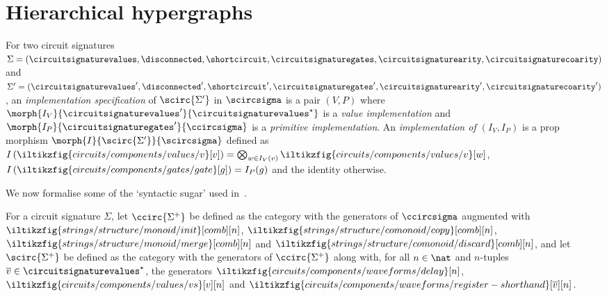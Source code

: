 \section{Hierarchical hypergraphs}

\begin{definition}[Implementation]
    For two circuit signatures \(\Sigma = (
        \circuitsignaturevalues,
        \disconnected,
        \shortcircuit,
        \circuitsignaturegates,
        \circuitsignaturearity,
        \circuitsignaturecoarity
    )\) and \(\Sigma^\prime = (
        \circuitsignaturevalues^\prime,
        \disconnected^\prime,
        \shortcircuit^\prime,
        \circuitsignaturegates^\prime,
        {\circuitsignaturearity}^\prime,
        {\circuitsignaturecoarity}^\prime
    )\), an \emph{implementation specification} of \(\scirc{\Sigma^\prime}\) in
    \(\scircsigma\)
    is a pair \((V,P)\) where \(
        \morph{I_V}{\circuitsignaturevalues^\prime}{\circuitsignaturevalues^\star}
    \) is a \emph{value implementation} and \(
        \morph{I_P}{\circuitsignaturegates^\prime}{\ccircsigma}
    \) is a \emph{primitive implementation}.
    An \emph{implementation of \((I_V, I_P)\)} is a prop morphism \(
        \morph{I}{\scirc{\Sigma^\prime}}{\scircsigma}
    \) defined as \(
        I\left(\iltikzfig{circuits/components/values/v}[v]\right)
        =
        \bigotimes_{w \in I_V(v)} \iltikzfig{circuits/components/values/v}[w]
    \), \(
        I\left(\iltikzfig{circuits/components/gates/gate}[g]\right)
        =
        I_P(g)
    \) and the identity otherwise.
\end{definition}

We now formalise some of the `syntactic sugar' used
in~\cite{ghica2022compositional}.

\begin{definition}
    For a circuit signature \(\Sigma\), let \(\ccirc{\Sigma^+}\) be defined as
    the category with the generators of \(\ccircsigma\) augmented with \(
        \iltikzfig{strings/structure/monoid/init}[comb][n]
    \), \(
        \iltikzfig{strings/structure/comonoid/copy}[comb][n]
    \), \(
        \iltikzfig{strings/structure/monoid/merge}[comb][n]
    \) and \(
        \iltikzfig{strings/structure/comonoid/discard}[comb][n]
    \), and let \(\scirc{\Sigma^+}\) be defined as the category with the generators of
    \(\ccirc{\Sigma^+}\) along with, for all \(n \in \nat\) and \(n\)-tuples
    \(\overline{v} \in \circuitsignaturevalues^\star\), the generators \(
        \iltikzfig{circuits/components/waveforms/delay}[n]
    \), \(
        \iltikzfig{circuits/components/values/vs}[v][n]
    \) and \(
        \iltikzfig{circuits/components/waveforms/register-shorthand}[\overline{v}][n]
    \).
\end{definition}